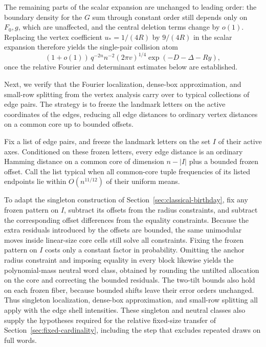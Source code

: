 The remaining parts of the scalar expansion are unchanged to leading order: the boundary density for the \(G\) sum through constant order still depends only on \(F_0,g\), which are unaffected, and the central deletion terms change by \(o(1)\). Replacing the vertex coefficient \(u_*=1/(4R)\) by \(9/(4R)\) in the scalar expansion therefore yields the single-pair collision atom
\[
 (1+o(1))\,q^{-2n}n^{-2}(2\pi v)^{1/4}
   \exp(-D-\Delta-Ry),
\]
once the relative Fourier and determinant estimates below are established.

Next, we verify that the Fourier localization, dense-box approximation, and small-row splitting from the vertex analysis carry over to typical collections of edge pairs. The strategy is to freeze the landmark letters on the active coordinates of the edges, reducing all edge distances to ordinary vertex distances on a common core up to bounded offsets.

Fix a list of edge pairs, and freeze the landmark letters on the set \(I\) of their active axes. Conditioned on these frozen letters, every edge distance is an ordinary Hamming distance on a common core of dimension \(n-|I|\) plus a bounded frozen offset. Call the list typical when all common-core tuple frequencies of its listed endpoints lie within \(O(n^{11/12})\) of their uniform means.

To adapt the singleton construction of Section~\ref{sec:classical-birthday}, fix any frozen pattern on \(I\), subtract its offsets from the radius constraints, and subtract the corresponding offset differences from the equality constraints. Because the extra residuals introduced by the offsets are bounded, the same unimodular moves inside linear-size core cells still solve all constraints. Fixing the frozen pattern on \(I\) costs only a constant factor in probability. Omitting the anchor radius constraint and imposing equality in every block likewise yields the polynomial-mass neutral word class, obtained by rounding the untilted allocation on the core and correcting the bounded residuals. The two-tilt bounds also hold on each frozen fiber, because bounded shifts leave their error orders unchanged. Thus singleton localization, dense-box approximation, and small-row splitting all apply with the edge shell intensities. These singleton and neutral classes also supply the hypotheses required for the relative fixed-size transfer of Section~\ref{sec:fixed-cardinality}, including the step that excludes repeated draws on full words.

